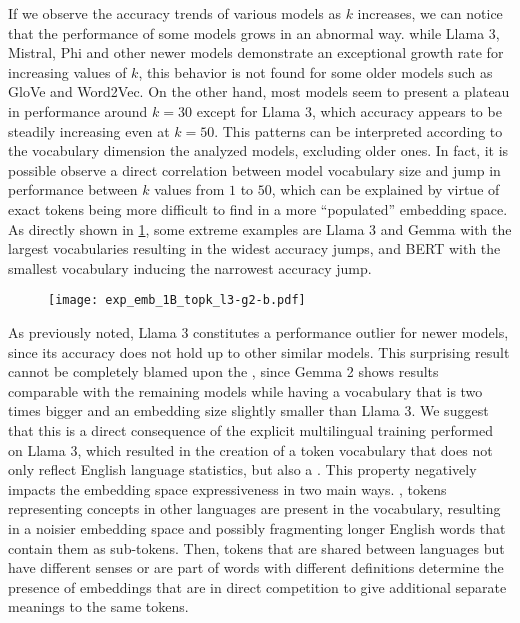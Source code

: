 If we observe the accuracy trends of various models as $k$ increases, we can notice that the performance of some models grows in an abnormal way.
 while Llama 3, Mistral, Phi and other newer models demonstrate an exceptional growth rate for increasing values of $k$, this behavior is not found for some older models such as GloVe and Word2Vec.
On the other hand, most models seem to present a plateau in performance around $k = 30$ except for Llama 3, which accuracy appears to be steadily increasing even at $k = 50$.
This patterns can be interpreted according to the vocabulary dimension the analyzed models, excluding older ones.
In fact, it is possible observe a direct correlation between model vocabulary size and jump in performance between $k$ values from $1$ to $50$, which can be explained by virtue of exact tokens being more difficult to find in a more ``populated'' embedding space.
As directly shown in \cref{fig:exp_emb_1_B}, some extreme examples are Llama 3 and Gemma with the largest vocabularies resulting in the widest accuracy jumps, and BERT with the smallest vocabulary inducing the narrowest accuracy jump.

\begin{figure}[t!]
    \centering
    \texttt{[image: exp\_emb\_1B\_topk\_l3-g2-b.pdf]}
    \caption{}
    \label{fig:exp_emb_1_B}
\end{figure}

As previously noted, Llama 3 constitutes a performance outlier for newer models, since its accuracy does not hold up to other similar models.
This surprising result cannot be completely blamed upon the , since Gemma 2 shows results comparable with the remaining models while having a vocabulary that is two times bigger and an embedding size slightly smaller than Llama 3.
We suggest that this is a direct consequence of the explicit multilingual training performed on Llama 3, which resulted in the creation of a token vocabulary that does not only reflect English language statistics, but also a .
This property negatively impacts the embedding space expressiveness in two main ways.
, tokens representing concepts in other languages are present in the vocabulary, resulting in a noisier embedding space and possibly fragmenting longer English words that contain them as sub-tokens.
Then, tokens that are shared between languages but have different senses or are part of words with different definitions determine the presence of embeddings that are in direct competition to give additional separate meanings to the same tokens.

